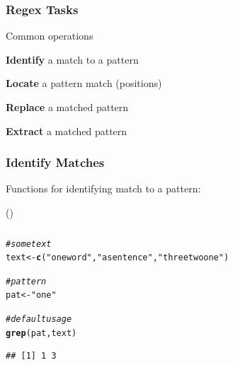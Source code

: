 \documentclass[12pt]{beamer}\usepackage[]{graphicx}\usepackage[]{color}
\makeatletter
\newcommand{\hlstr}[1]{\textcolor[rgb]{0.192,0.494,0.8}{#1}}%
\newcommand{\hlcom}[1]{\textcolor[rgb]{0.678,0.584,0.686}{\textit{#1}}}%
\newcommand{\hlstd}[1]{\textcolor[rgb]{0.345,0.345,0.345}{#1}}%
\newcommand{\hlkwb}[1]{\textcolor[rgb]{0.69,0.353,0.396}{#1}}%
\newcommand{\hlkwd}[1]{\textcolor[rgb]{0.737,0.353,0.396}{\textbf{#1}}}%
\newenvironment{kframe}{%
 \def\at@end@of@kframe{}%
 \ifinner\ifhmode%
  \def\at@end@of@kframe{\end{minipage}}%
  \begin{minipage}{\columnwidth}%
 \fi\fi%
 \def\FrameCommand##1{\hskip\@totalleftmargin \hskip-\fboxsep
 \colorbox{shadecolor}{##1}\hskip-\fboxsep
     \hskip-\linewidth \hskip-\@totalleftmargin \hskip\columnwidth}%
 \MakeFramed {\advance\hsize-\width
   \@totalleftmargin\z@ \linewidth\hsize
   \@setminipage}}%
 {\par\unskip\endMakeFramed%
 \at@end@of@kframe}
\newenvironment{knitrout}{}{} %
\makeatother
\begin{document}

\begin{frame}
\frametitle{Regex Tasks}

Common operations
\bi
  \item \textbf{Identify} a match to a pattern
  \item \textbf{Locate} a pattern match (positions)
  \item \textbf{Replace} a matched pattern
  \item \textbf{Extract} a matched pattern
\ei

\end{frame}


\begin{frame}
\begin{center}
\Huge{}
\end{center}
\end{frame}


\begin{frame}
\frametitle{Identify Matches}

Functions for identifying match to a pattern: 
\bbi
  \item {}
  \item {}
  \item {} ()
\ei

\end{frame}


\begin{frame}[fragile]
\frametitle{}

\begin{knitrout}\footnotesize
{}\color{fgcolor}\begin{kframe}
\begin{alltt}
\hlcom{# some text}
\hlstd{text} \hlkwb{<-} \hlkwd{c}\hlstd{(}\hlstr{"one word"}\hlstd{,} \hlstr{"a sentence"}\hlstd{,} \hlstr{"three two one"}\hlstd{)}

\hlcom{# pattern}
\hlstd{pat} \hlkwb{<-} \hlstr{"one"}

\hlcom{# default usage}
\hlkwd{grep}\hlstd{(pat, text)}
\end{alltt}
\begin{verbatim}
## [1] 1 3
\end{verbatim}
\end{kframe}
\end{knitrout}

\end{frame}
\end{document}

